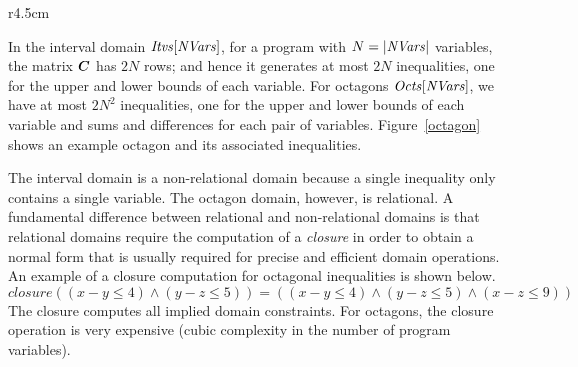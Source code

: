 %
\begin{wrapfigure}{r}{4.5cm}
\vspace*{-3ex}
\caption{Example of an octagon}\label{octagon}
\vspace*{-3ex}
\end{wrapfigure} 
%
In the interval domain $\mathit{Itvs}[\mathit{NVars}]$,
for a program with $N=|\mathit{NVars}|$ variables, the matrix ${\boldsymbol C}$ 
has $2N$ rows; and hence it generates at most $2N$ inequalities, one
for the upper and lower bounds of each variable.
%
For octagons $\mathit{Octs}[\mathit{NVars}]$, we have at most $2N^2$
inequalities, one for the upper and lower bounds of each variable and
sums and differences for each pair of variables. Figure~\ref{octagon}
shows an example octagon and its associated inequalities.

The interval domain is a non-relational domain because a single
inequality only contains a single variable.
%
The octagon domain, however, is relational.  A fundamental difference
between relational and non-relational domains is that relational
domains require the computation of a \emph{closure} in order to obtain
a normal form that is usually required for precise and efficient 
domain operations.  An example of a closure computation for octagonal 
inequalities is shown below.
\[\mathit{closure}((x-y \leq 4) \wedge (y-z \leq 5))=((x-y \leq 4) \wedge (y-z \leq 5) \wedge (x-z \leq 9)) \]  
The closure computes all implied domain constraints.  For octagons,
the closure operation is very expensive (cubic complexity in the
number of program variables).
%

